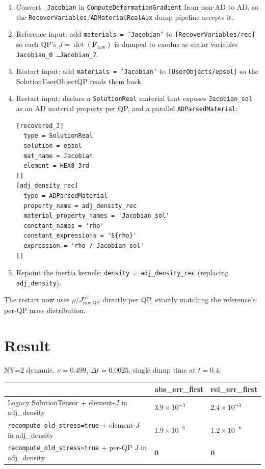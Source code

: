 \documentclass[11pt]{article}
\newcommand{\F}{\mathbf{F}}
\begin{document}
\begin{enumerate}
\item Convert \texttt{\_Jacobian} in \texttt{ComputeDeformationGradient} from non-AD to AD, so the \texttt{RecoverVariables}/\texttt{ADMaterialRealAux} dump pipeline accepts it.
\item Reference input: add \texttt{materials = 'Jacobian'} to \texttt{[RecoverVariables/rec]} so each QP's $J = \det(\F_{\text{raw}})$ is dumped to exodus as scalar variables \texttt{Jacobian\_0 \dots Jacobian\_7}.
\item Restart input: add \texttt{materials = 'Jacobian'} to \texttt{[UserObjects/epsol]} so the SolutionUserObjectQP reads them back.
\item Restart input: declare a \texttt{SolutionReal} material that exposes \texttt{Jacobian\_sol} as an AD material property per QP, and a parallel \texttt{ADParsedMaterial}:
\begin{lstlisting}
[recovered_J]
  type = SolutionReal
  solution = epsol
  mat_name = Jacobian
  element = HEX8_3rd
[]
[adj_density_rec]
  type = ADParsedMaterial
  property_name = adj_density_rec
  material_property_names = 'Jacobian_sol'
  constant_names = 'rho'
  constant_expressions = '${rho}'
  expression = 'rho / Jacobian_sol'
[]
\end{lstlisting}
\item Repoint the inertia kernels: \texttt{density = adj\_density\_rec} (replacing \texttt{adj\_density}).
\end{enumerate}

The restart now uses $\rho / J_{\text{raw,QP}}^{\text{ref}}$ directly per QP, exactly matching the reference's per-QP mass distribution.

\section{Result}

NY=2 dynamic, $\nu = 0.499$, $\Delta t = 0.0025$, single dump time at $t = 0.4$:

\begin{center}
\begin{tabular}{lll}
\toprule
 & abs\_err\_first & rel\_err\_first \\
\midrule
Legacy SolutionTensor + element-$J$ in adj\_density & $3.9 \times 10^{-3}$ & $2.4 \times 10^{-3}$ \\
\texttt{recompute\_old\_stress=true} + element-$J$ in adj\_density & $1.9 \times 10^{-6}$ & $1.2 \times 10^{-6}$ \\
\texttt{recompute\_old\_stress=true} + per-QP $J$ in adj\_density & $\mathbf{0}$ & $\mathbf{0}$ \\
\bottomrule
\end{tabular}
\end{center}
\end{document}
